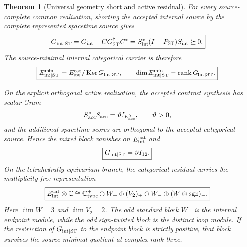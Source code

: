 \documentclass[11pt]{article}
\newtheorem{theorem}{Theorem}[section]
\theoremstyle{definition}
\theoremstyle{remark}
\newcommand{\C}{\mathbb C}
\newcommand{\rank}{\operatorname{rank}}
\newcommand{\Ker}{\operatorname{Ker}}
\begin{document}
\begin{theorem}[Universal geometry short and active residual]
\label{thm:geometry-short}
For every source-complete common realization, shorting the accepted internal
source by the complete represented spacetime source gives
\begin{equation}
\boxed{
G_{{\rm int}\mid{\rm ST}}
=
G_{\rm int}-CG_{\rm ST}^{\dagger}C^*
=
S_{\rm int}^*(I-P_{\rm ST})S_{\rm int}
\succeq0.}
\label{eq:geometry-short-general}
\end{equation}
The source-minimal internal categorical carrier is therefore
\begin{equation}
\boxed{
E_{{\rm int}\mid{\rm ST}}^{\min}
=
E_{\rm int}^{\rm cat}/\Ker G_{{\rm int}\mid{\rm ST}},
\qquad
\dim E_{{\rm int}\mid{\rm ST}}^{\min}
=
\rank G_{{\rm int}\mid{\rm ST}}.}
\label{eq:geometry-short-quotient}
\end{equation}

On the explicit orthogonal active realization, the accepted contrast synthesis
has scalar Gram
\[
S_{\rm acc}^*S_{\rm acc}=\vartheta I_{E_{\rm acc}^0},
\qquad \vartheta>0,
\]
and the additional spacetime scores are orthogonal to the accepted categorical
source.  Hence the mixed block vanishes on $E_{\rm int}^{\rm cat}$ and
\begin{equation}
\boxed{
G_{{\rm int}\mid{\rm ST}}=\vartheta I_{12}.}
\label{eq:geometry-short}
\end{equation}
On the tetrahedrally equivariant branch, the categorical residual carries the
multiplicity-free representation
\begin{equation}
\boxed{
E_{\rm int}^{\rm cat}\otimes\C
\cong
\C_{\rm type}^{+}
\oplus W_+
\oplus(V_2)_+
\oplus W_-
\oplus(W\otimes{\rm sgn})_-.}
\label{eq:residual-S4}
\end{equation}
Here $\dim W=3$ and $\dim V_2=2$.  The odd standard block $W_-$ is the
internal endpoint module, while the odd sign-twisted block is the distinct loop
module.  If the restriction of $G_{{\rm int}\mid{\rm ST}}$ to the endpoint
block is strictly positive, that block survives the source-minimal quotient at
complex rank three.
\end{theorem}
\end{document}

